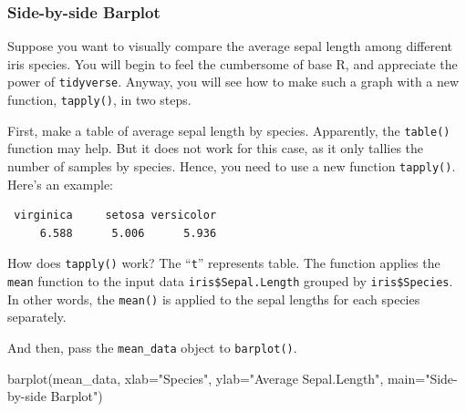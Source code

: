 \documentclass[
  letterpaper,
]{book}
\newenvironment{Shaded}{\begin{snugshade}}{\end{snugshade}}
\newcommand{\AttributeTok}[1]{\textcolor[rgb]{0.40,0.45,0.13}{#1}}
\newcommand{\FunctionTok}[1]{\textcolor[rgb]{0.28,0.35,0.67}{#1}}
\newcommand{\NormalTok}[1]{\textcolor[rgb]{0.00,0.23,0.31}{#1}}
\newcommand{\OtherTok}[1]{\textcolor[rgb]{0.00,0.23,0.31}{#1}}
\newcommand{\SpecialCharTok}[1]{\textcolor[rgb]{0.37,0.37,0.37}{#1}}
\newcommand{\StringTok}[1]{\textcolor[rgb]{0.13,0.47,0.30}{#1}}
\begin{document}
\subsubsection{Side-by-side Barplot}\label{side-by-side-barplot}

Suppose you want to visually compare the average sepal length among
different iris species. You will begin to feel the cumbersome of base R,
and appreciate the power of \texttt{tidyverse}. Anyway, you will see how
to make such a graph with a new function, \texttt{tapply()}, in two
steps.

First, make a table of average sepal length by species. Apparently, the
\texttt{table()} function may help. But it does not work for this case,
as it only tallies the number of samples by species. Hence, you need to
use a new function \texttt{tapply()}. Here's an example:

\begin{Shaded}
\end{Shaded}

\begin{verbatim}
 virginica     setosa versicolor 
     6.588      5.006      5.936 
\end{verbatim}

How does \texttt{tapply()} work? The ``\texttt{t}'' represents table.
The function applies the \texttt{mean} function to the input data
\texttt{iris\$Sepal.Length} grouped by \texttt{iris\$Species}. In other
words, the \texttt{mean()} is applied to the sepal lengths for each
species separately.

And then, pass the \texttt{mean\_data} object to \texttt{barplot()}.

\begin{Shaded}
\begin{Highlighting}[]
\FunctionTok{barplot}\NormalTok{(mean\_data,}
        \AttributeTok{xlab=}\StringTok{"Species"}\NormalTok{, }
        \AttributeTok{ylab=}\StringTok{"Average Sepal.Length"}\NormalTok{, }
        \AttributeTok{main=}\StringTok{"Side{-}by{-}side Barplot"}\NormalTok{)}
\end{Highlighting}
\end{Shaded}
\end{document}
